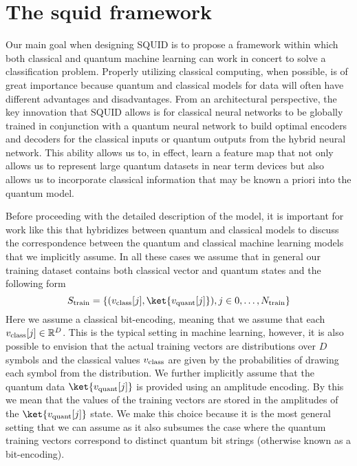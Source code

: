 
\section{The squid framework}
\label{sec:squid}
Our main goal when designing SQUID is to propose a framework within which both classical and quantum machine learning can work in concert to solve a classification problem.
Properly utilizing classical computing, when possible, is of great importance because quantum and classical models for data will often have different advantages and disadvantages.
From an architectural perspective, the key innovation that SQUID allows is for classical neural networks to be globally trained in conjunction with a quantum neural network to build optimal encoders and decoders for the classical inputs or quantum outputs from the hybrid neural network.
This ability allows us to, in effect, learn a feature map that not only allows us to represent large quantum datasets in near term devices but also allows us to incorporate classical information that may be known a priori into the quantum model.

Before proceeding with the detailed description of the model, it is important for work like this that hybridizes between quantum and classical models to discuss the correspondence between the quantum and classical machine learning models that we implicitly assume.
In all these cases we assume that in general our training dataset contains both classical vector and quantum states and the following form
\begin{equation}
S_{\rm train} = \{(v_{\rm class}[j],\ket{v_{\rm quant}[j]}), j\in 0,\ldots,N_{\rm train} \}
\end{equation}
Here we assume a classical bit-encoding, meaning that we assume that each $v_{\rm class}[j] \in \mathbb{R}^D$.
This is the typical setting in machine learning, however, it is also possible to envision that the actual training vectors are distributions over $D$ symbols and the classical values $v_{\rm class}$ are given by the probabilities of drawing each symbol from the distribution.
We further implicitly assume that the quantum data $\ket{v_{\rm quant}[j]}$ is provided using an amplitude encoding.  By this we mean that the values of the training vectors are stored in the amplitudes of the $\ket{v_{\rm quant}[j]}$ state.
We make this choice because it is the most general setting that we can assume as it also subsumes the case where the quantum training vectors correspond to distinct quantum bit strings (otherwise known as a bit-encoding).

